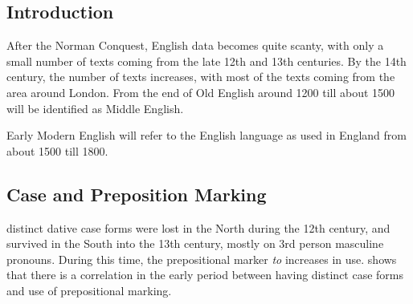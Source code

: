 \subsection{Introduction}
After the Norman Conquest, English data becomes quite scanty, with only a small number of texts coming from the late 12th and 13th centuries. By the 14th century, the number of texts increases, with most of the texts coming from the area around London. From the end of Old English around 1200 till about 1500 will be identified as Middle English.

Early Modern English will refer to the English language as used in England from about 1500 till 1800.
\subsection{Case and Preposition Marking}
\cite[213]{Allen.1999} distinct dative case forms were lost in the North during the 12th century, and survived in the South into the 13th century, mostly on 3rd person masculine pronouns. During this time, the prepositional marker \emph{to} increases in use. \cite{McFadden.2002} shows that there is a correlation in the early period between having distinct case forms and use of prepositional marking.
